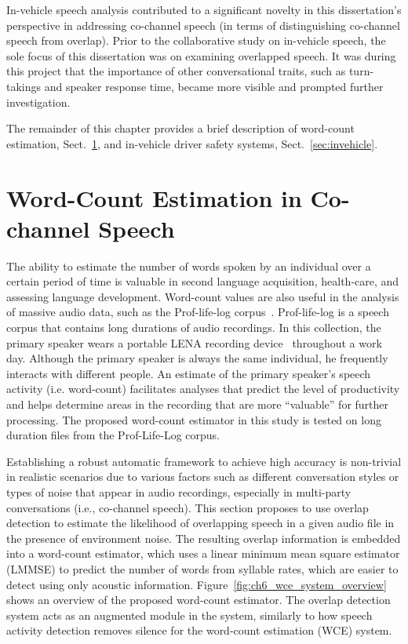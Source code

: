 In-vehicle speech analysis contributed to a significant novelty in this dissertation's perspective in addressing co-channel speech (in terms of distinguishing co-channel speech from overlap). 
Prior to the collaborative study on in-vehicle speech, the sole focus of this dissertation was on examining overlapped speech. 
It was during this project that the importance of other conversational traits, such as turn-takings and speaker response time, became more visible and prompted further investigation. 

The remainder of this chapter provides a brief description of word-count estimation, Sect.~\ref{sec:wce_cch}, and in-vehicle driver safety systems, Sect.~\ref{sec:invehicle}. 


\section{Word-Count Estimation in Co-channel Speech}
\label{sec:wce_cch}
The ability to estimate the number of words spoken by an individual over a certain period of time is valuable in second language acquisition, health-care, and assessing language development. 
Word-count values are also useful in the analysis of massive audio data, such as the Prof-life-log corpus~\cite{ziaei2013prof}. 
Prof-life-log is a speech corpus that contains long durations of audio recordings. In this collection, the primary speaker wears a portable LENA recording device~\cite{lena_device} throughout a work day. 
Although the primary speaker is always the same individual, he frequently interacts with different people. 
An estimate of the primary speaker's speech activity (i.e. word-count) facilitates analyses that predict the level of productivity and helps determine areas in the recording that are more ``valuable'' for further processing. 
The proposed word-count estimator in this study is tested on long duration files from the Prof-Life-Log corpus. 

Establishing a robust automatic framework to achieve high accuracy is non-trivial in realistic scenarios due to various factors such as different conversation styles or types of noise that appear in audio recordings, especially in multi-party conversations (i.e., co-channel speech). 
This section proposes to use overlap detection to estimate the likelihood of overlapping speech in a given audio file in the presence of environment noise. 
The resulting overlap information is embedded into a word-count estimator, which uses a linear minimum mean square estimator (LMMSE) to predict the number of words from syllable rates, which are easier to detect using only acoustic information. 
Figure~\ref{fig:ch6_wce_system_overview} shows an overview of the proposed word-count estimator. 
The overlap detection system acts as an augmented module in the system, similarly to how speech activity detection removes silence for the word-count estimation (WCE) system. 

